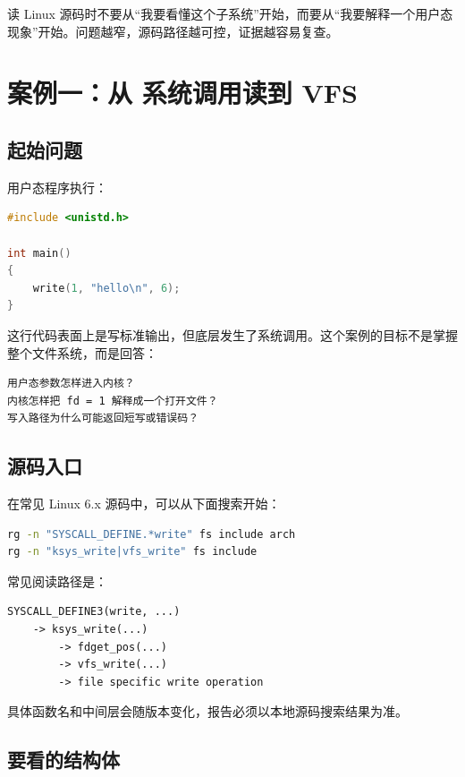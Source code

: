 \begin{mentalmodel}
读 Linux 源码时不要从“我要看懂这个子系统”开始，而要从“我要解释一个用户态现象”开始。问题越窄，源码路径越可控，证据越容易复查。
\end{mentalmodel}

\section{案例一：从  系统调用读到 VFS}

\subsection{起始问题}

用户态程序执行：

\begin{lstlisting}[language=C++]
#include <unistd.h>

int main()
{
    write(1, "hello\n", 6);
}
\end{lstlisting}

这行代码表面上是写标准输出，但底层发生了系统调用。这个案例的目标不是掌握整个文件系统，而是回答：

\begin{lstlisting}
用户态参数怎样进入内核？
内核怎样把 fd = 1 解释成一个打开文件？
写入路径为什么可能返回短写或错误码？
\end{lstlisting}

\subsection{源码入口}

在常见 Linux 6.x 源码中，可以从下面搜索开始：

\begin{lstlisting}[language=bash]
rg -n "SYSCALL_DEFINE.*write" fs include arch
rg -n "ksys_write|vfs_write" fs include
\end{lstlisting}

常见阅读路径是：

\begin{lstlisting}
SYSCALL_DEFINE3(write, ...)
    -> ksys_write(...)
        -> fdget_pos(...)
        -> vfs_write(...)
        -> file specific write operation
\end{lstlisting}

具体函数名和中间层会随版本变化，报告必须以本地源码搜索结果为准。

\subsection{要看的结构体}

